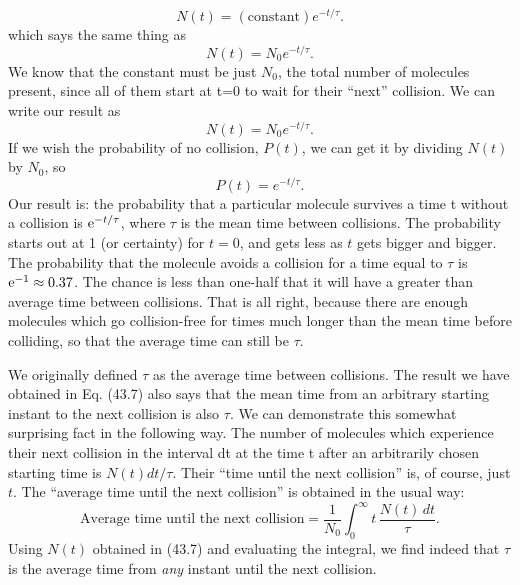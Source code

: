 \begin{subappendices}
\begin{equation}
\label{Eq:I:43:6}
N(t) = (\text{constant})e^{-t/\tau}.
\end{equation}
which says the same thing as
\begin{equation}
\label{Eq:I:43:7}
N(t) = N_0e^{-t/\tau}.
\end{equation}
We know that the constant must be just $N_{0}$, the total number of molecules present, since all of them start at t=0 to wait for their ``next'' collision. We can write our result as
\begin{equation}
\label{Eq:I:43:7}
N(t) = N_0e^{-t/\tau}.
\end{equation}
If we wish the probability of no collision, $P(t)$, we can get it by dividing $N(t)$ by $N_{0}$, so
\begin{equation}
\label{Eq:I:43:8}
P(t) = e^{-t/\tau}.
\end{equation}
Our result is: the probability that a particular molecule survives a time t without a collision is $\mathrm{e}^{-t/\tau}$, where $\tau$ is the mean time between collisions. The probability starts out at 1 (or certainty) for $t=0$, and gets less as $t$ gets bigger and bigger. The probability that the molecule avoids a collision for a time equal to $\tau$ is $\mathrm{e}^{-1} \approx 0.37$. The chance is less than one-half that it will have a greater than average time between collisions. That is all right, because there are enough molecules which go collision-free for times much longer than the mean time before colliding, so that the average time can still be $\tau$.

We originally defined $\tau$ as the average time between collisions. The result we have obtained in Eq. (43.7) also says that the mean time from an arbitrary starting instant to the next collision is also $\tau$. We can demonstrate this somewhat surprising fact in the following way. The number of molecules which experience their next collision in the interval dt at the time t after an arbitrarily chosen starting time is $N(t)dt/\tau$. Their ``time until the next collision'' is, of course, just $t$. The ``average time until the next collision'' is obtained in the usual way:
\begin{equation*}
\text{Average time until the next collision} =
\frac{1}{N_0}\int_0^\infty t\,\frac{N(t)\,dt}{\tau}.
\end{equation*}
%
Using $N(t)$ obtained in (43.7) and evaluating the integral, we find indeed that $\tau$ is the average time from \emph{any} instant until the next collision.
\end{subappendices}

